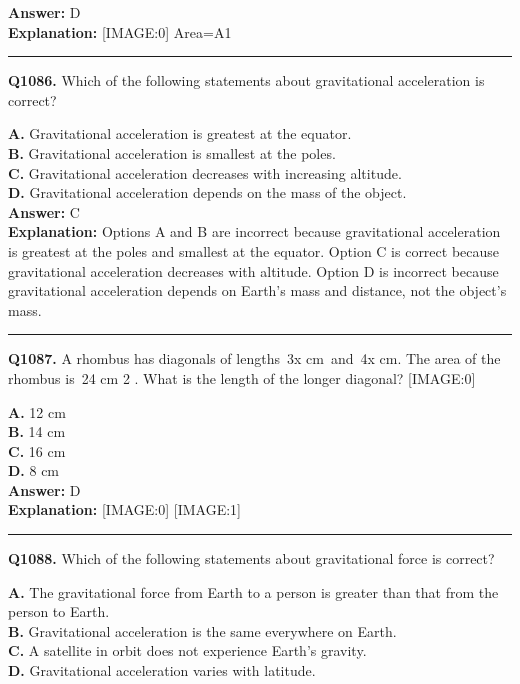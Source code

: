\documentclass[12pt]{article}
\begin{document}
\textbf{Answer:} D \\
\textbf{Explanation:} [IMAGE:0]
Area=A1

\hrule
\vspace{1em}


\noindent
\textbf{Q1086.} Which of the following statements about gravitational acceleration is correct?



\textbf{A.} Gravitational acceleration is greatest at the equator. \\
\textbf{B.} Gravitational acceleration is smallest at the poles. \\
\textbf{C.} Gravitational acceleration decreases with increasing altitude. \\
\textbf{D.} Gravitational acceleration depends on the mass of the object. \\

\textbf{Answer:} C \\
\textbf{Explanation:} Options A and B are incorrect because gravitational acceleration is greatest at the poles and smallest at the equator. Option C is correct because gravitational acceleration decreases with altitude. Option D is incorrect because gravitational acceleration depends on Earth's mass and distance, not the object's mass.

\hrule
\vspace{1em}


\noindent
\textbf{Q1087.} A rhombus has diagonals of lengths 3x
cm and 4x
cm. The area of the rhombus is 24
cm
2
. What is the length of the longer diagonal?
[IMAGE:0]



\textbf{A.} 12 cm \\
\textbf{B.} 14 cm \\
\textbf{C.} 16 cm \\
\textbf{D.} 8 cm \\

\textbf{Answer:} D \\
\textbf{Explanation:} [IMAGE:0]
[IMAGE:1]

\hrule
\vspace{1em}


\noindent
\textbf{Q1088.} Which of the following statements about gravitational force is correct?



\textbf{A.} The gravitational force from Earth to a person is greater than that from the person to Earth. \\
\textbf{B.} Gravitational acceleration is the same everywhere on Earth. \\
\textbf{C.} A satellite in orbit does not experience Earth's gravity. \\
\textbf{D.} Gravitational acceleration varies with latitude. \\
\end{document}
